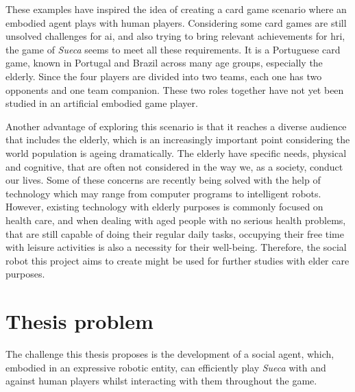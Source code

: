 These examples have inspired the idea of creating a card game scenario where an embodied agent plays with human players.
Considering some card games are still unsolved challenges for \ac{ai}, and also trying to bring relevant achievements for \ac{hri}, the game of \emph{Sueca} seems to meet all these requirements.
It is a Portuguese card game, known in Portugal and Brazil across many age groups, especially the elderly.
Since the four players are divided into two teams, each one has two opponents and one team companion.
These two roles together have not yet been studied in an artificial embodied game player.

Another advantage of exploring this scenario is that it reaches a diverse audience that includes the elderly, which is an increasingly important point considering the world population is ageing dramatically.
The elderly have specific needs, physical and cognitive, that are often not considered in the way we, as a society, conduct our lives.
Some of these concerns are recently being solved with the help of technology which may range from computer programs to intelligent robots.
However, existing technology with elderly purposes is commonly focused on health care, and when dealing with aged people with no serious health problems, that are still capable of doing their regular daily tasks, occupying their free time with leisure activities is also a necessity for their well-being.
Therefore, the social robot this project aims to create might be used for further studies with elder care purposes.



\section*{Thesis problem}
\label{sec:problem}

The challenge this thesis proposes is the development of a social agent, which, embodied in an expressive robotic entity, can efficiently play \emph{Sueca} with and against human players whilst interacting with them throughout the game.

